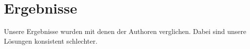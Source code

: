 \chapter{Ergebnisse}
Unsere Ergebnisse wurden mit denen der Authoren verglichen.  Dabei
sind unsere Lösungen konsistent schlechter.
